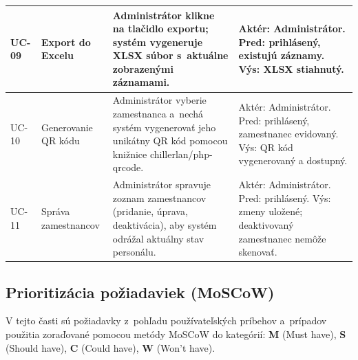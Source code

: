 \begin{longtable}{|p{1.1cm}|p{3.2cm}|p{6.2cm}|p{4.2cm}|}
\hline
UC-09 & Export do Excelu &
Administrátor klikne na tlačidlo exportu; systém vygeneruje XLSX súbor
s~aktuálne zobrazenými záznamami. &
Aktér: Administrátor. Pred: prihlásený, existujú záznamy. Výs: XLSX stiahnutý. \\
\hline
UC-10 & Generovanie QR kódu &
Administrátor vyberie zamestnanca a~nechá systém vygenerovať jeho unikátny QR
kód pomocou knižnice chillerlan/php-qrcode. &
Aktér: Administrátor. Pred: prihlásený, zamestnanec evidovaný. Výs: QR kód vygenerovaný a dostupný. \\
\hline
UC-11 & Správa zamestnancov &
Administrátor spravuje zoznam zamestnancov (pridanie, úprava, deaktivácia), aby systém
odrážal aktuálny stav personálu. &
Aktér: Administrátor. Pred: prihlásený. Výs: zmeny uložené; deaktivovaný zamestnanec nemôže skenovať. \\
\hline
\end{longtable}

\subsection{Prioritizácia požiadaviek (MoSCoW)}

V tejto časti sú požiadavky z~pohľadu používateľských príbehov a~prípadov použitia
zoraďované pomocou metódy MoSCoW do kategórií:
\textbf{M} (Must have), \textbf{S} (Should have), \textbf{C} (Could have),
\textbf{W} (Won't have).

